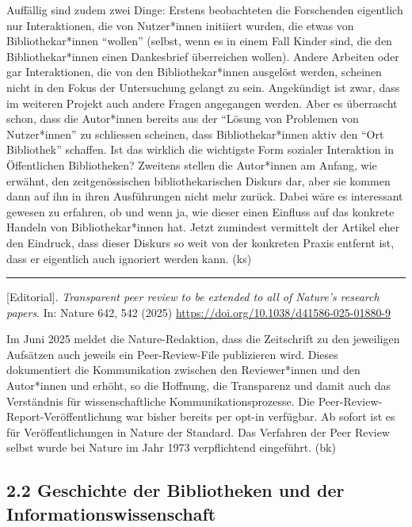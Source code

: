 \documentclass[a4paper,
fontsize=11pt,
oneside,
numbers=noperiodatend,
parskip=half-,
bibliography=totoc,
final
]{scrartcl}
\begin{document}
Auffällig sind zudem zwei Dinge: Erstens beobachteten die Forschenden
eigentlich nur Interaktionen, die von Nutzer*innen initiiert wurden, die
etwas von Bibliothekar*innen \enquote{wollen} (selbst, wenn es in einem Fall
Kinder sind, die den Bibliothekar*innen einen Dankesbrief überreichen
wollen). Andere Arbeiten oder gar Interaktionen, die von den
Bibliothekar*innen ausgelöst werden, scheinen nicht in den Fokus der
Untersuchung gelangt zu sein. Angekündigt ist zwar, dass im weiteren
Projekt auch andere Fragen angegangen werden. Aber es überrascht schon,
dass die Autor*innen bereits aus der \enquote{Lösung von Problemen von
Nutzer*innen} zu schliessen scheinen, dass Bibliothekar*innen aktiv den
\enquote{Ort Bibliothek} schaffen. Ist das wirklich die wichtigste Form sozialer
Interaktion in Öffentlichen Bibliotheken? Zweitens stellen die
Autor*innen am Anfang, wie erwähnt, den zeitgenössischen
bibliothekarischen Diskurs dar, aber sie kommen dann auf ihn in ihren
Ausführungen nicht mehr zurück. Dabei wäre es interessant gewesen zu
erfahren, ob und wenn ja, wie dieser einen Einfluss auf das konkrete
Handeln von Bibliothekar*innen hat. Jetzt zumindest vermittelt der
Artikel eher den Eindruck, dass dieser Diskurs so weit von der konkreten
Praxis entfernt ist, dass er eigentlich auch ignoriert werden kann. (ks)

\begin{center}\rule{0.5\linewidth}{0.5pt}\end{center}

{[}Editorial{]}. \emph{Transparent peer review to be extended to all of
Nature's research papers}. In: Nature 642, 542 (2025)
\url{https://doi.org/10.1038/d41586-025-01880-9}

Im Juni 2025 meldet die Nature-Redaktion, dass die Zeitschrift zu den
jeweiligen Aufsätzen auch jeweils ein Peer-Review-File publizieren wird.
Dieses dokumentiert die Kommunikation zwischen den Reviewer*innen und
den Autor*innen und erhöht, so die Hoffnung, die Transparenz und damit
auch das Verständnis für wissenschaftliche Kommunikationsprozesse. Die
Peer-Review-Report-Veröffentlichung war bisher bereits per opt-in
verfügbar. Ab sofort ist es für Veröffentlichungen in Nature der
Standard. Das Verfahren der Peer Review selbst wurde bei Nature im Jahr
1973 verpflichtend eingeführt. (bk)

\subsection{2.2 Geschichte der Bibliotheken und der
Informationswissenschaft}\label{geschichte-der-bibliotheken-und-der-informationswissenschaft}
\end{document}
